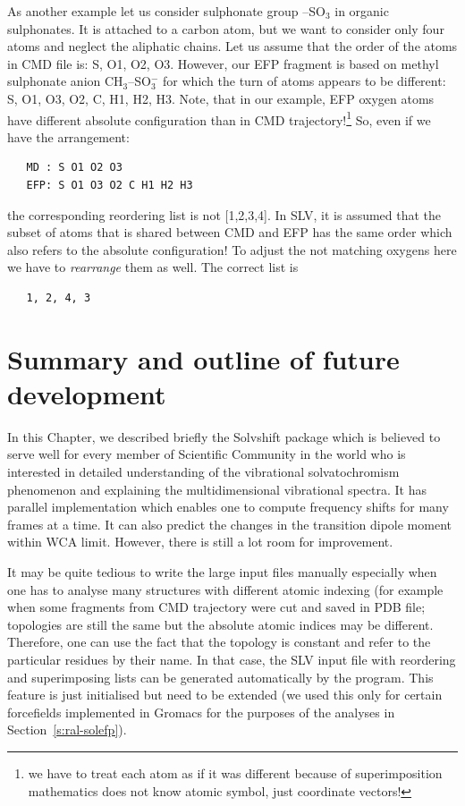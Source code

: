 \documentclass[a4paper,titlepage,twoside,fleqn,12pt]{book}
\begin{document}
\begin{refsection}
As another example let us consider sulphonate group --SO$_3$
in organic sulphonates. It is attached to a carbon atom, but we want to consider only four atoms
and neglect the aliphatic chains. 
Let us assume that the order of the atoms in CMD file is: 
S, O1, O2, O3. However, our EFP fragment is based on methyl sulphonate anion CH$_3$--SO$_3^-$
for which the turn of atoms appears to be different: S, O1, O3, O2, C, H1, H2, H3. Note, that in our
example, EFP oxygen atoms have different absolute configuration than in CMD trajectory!\footnote{we have to treat
each atom as if it was different because of superimposition mathematics does not know atomic symbol,
just coordinate vectors!} So, even if we have the arrangement:
%
\begin{verbatim}
   MD : S O1 O2 O3
   EFP: S O1 O3 O2 C H1 H2 H3
\end{verbatim}
%
the corresponding reordering list is not [1,2,3,4]. In SLV, it is assumed
that the subset of atoms that is shared between CMD and EFP has the same order which also refers to the
absolute configuration! To adjust the not matching oxygens here we have to \emph{rearrange}
them as well. The correct list is
%
\begin{verbatim}
   1, 2, 4, 3
\end{verbatim}
%


\section{Summary and outline of future development}

In this Chapter, we described briefly the {\sc Solvshift} package
which is believed to serve well for every member of Scientific Community
in the world who is interested in detailed understanding of the
vibrational solvatochromism phenomenon and explaining
the multidimensional vibrational spectra. It has parallel 
implementation which enables one to compute frequency shifts
for many frames at a time. It can also predict the changes in the
transition dipole moment within WCA limit. However, there is still a lot room for improvement.

It may be quite tedious to write the large input files manually especially when one has to analyse many
structures with different atomic indexing (for example when some fragments from CMD trajectory were
cut and saved in PDB file; topologies are still the same but the absolute atomic indices may be different.
Therefore, one can use the fact that the topology is constant and refer to the particular residues by their
name. In that case, the SLV input file with reordering and superimposing lists can be generated
automatically by the program. This feature is just initialised but need to be extended (we used
this only for certain forcefields implemented in {\sc Gromacs} for the purposes
of the analyses in Section~\ref{s:ral-solefp}).


\end{refsection}
\end{document}
